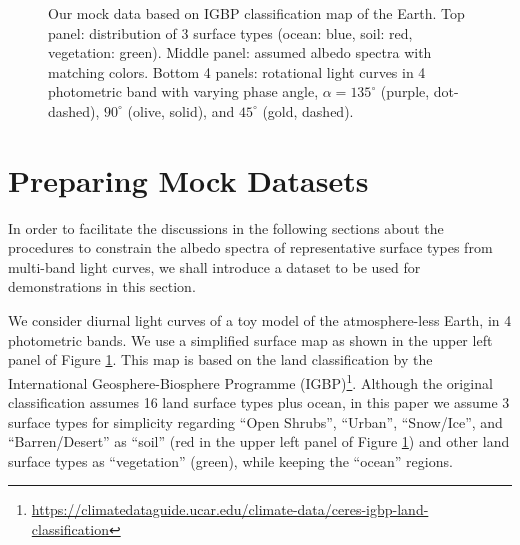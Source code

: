 \documentclass[iop,numberedappendix,apj,]{emulateapj}
\begin{document}
\begin{figure}[t]
\begin{center}
    \end{center}
    \caption{Our mock data based on IGBP classification map of the Earth. Top panel: distribution of 3 surface types (ocean: blue, soil: red, vegetation: green). Middle panel: assumed albedo spectra with matching colors. Bottom 4 panels: rotational light curves in 4 photometric band with varying phase angle, $\alpha = 135^{\circ }$ (purple, dot-dashed), $90^{\circ }$ (olive, solid), and $45^{\circ }$ (gold, dashed). }
\label{fig:mockdata}
\end{figure}


\section{Preparing Mock Datasets}
\label{s:mockdata}

In order to facilitate the discussions in the following sections about the procedures to constrain the albedo spectra of representative surface types from multi-band light curves, we shall introduce a dataset to be used for demonstrations in this section. 

We consider diurnal light curves of a toy model of the atmosphere-less Earth, in 4 photometric bands. 
We use a simplified surface map as shown in the upper left panel of Figure \ref{fig:mockdata}. 
This map is based on the land classification by the International Geosphere-Biosphere Programme (IGBP)\footnote{\url{https://climatedataguide.ucar.edu/climate-data/ceres-igbp-land-classification}}. 
Although the original classification assumes 16 land surface types plus ocean, in this paper we assume 3 surface types for simplicity regarding ``Open Shrubs'', ``Urban'', ``Snow/Ice'', and ``Barren/Desert'' as ``soil'' (red in the upper left panel of Figure \ref{fig:mockdata}) and other land surface types as ``vegetation'' (green), while keeping the ``ocean'' regions. 
\end{document}
